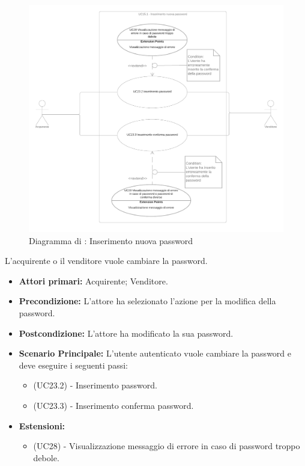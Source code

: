\begin{figure}[H]
    \centering
    \includegraphics[width=\textwidth]{Immagini/DiagrammiUC/UC15.1InserimentoNuovaPassword}
    \caption{Diagramma di \actualUC: Inserimento nuova password} 
    \label{fig:VisualizzazioneProdottiNelCarrello}
\end{figure}

L'acquirente o il venditore vuole cambiare la password.
\begin{itemize}
    \item \textbf{Attori primari:} Acquirente; Venditore.
    \item \textbf{Precondizione:} L'attore ha selezionato l'azione per la modifica della password.
    \item \textbf{Postcondizione:} L'attore ha modificato la sua password.
    \item \textbf{Scenario Principale:} L'utente autenticato vuole cambiare la password e deve eseguire i seguenti passi:
    \begin{itemize}
        \item (UC23.2) - Inserimento password.
        \item (UC23.3) - Inserimento conferma password.
    \end{itemize}
    \item \textbf{Estensioni:}
    \begin{itemize}
        \item (UC28) - Visualizzazione messaggio di errore in caso di password troppo debole.
    \end{itemize}
\end{itemize}

